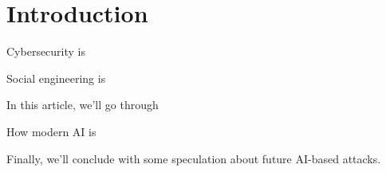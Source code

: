 
\chapter{Introduction\label{intro}}

Cybersecurity is

Social engineering is

In this article, we'll go through

How modern AI is

Finally, we'll conclude with some speculation about future AI-based attacks.

\citep{wang_defining_2020,latexcompanion,knuth99}
\cite{wang_defining_2020,latexcompanion,knuth99}






